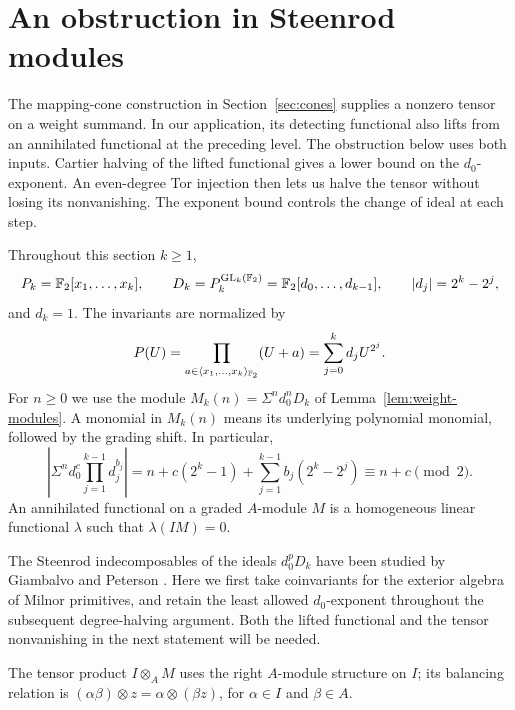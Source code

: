 \section{An obstruction in Steenrod modules}\label{sec:algebra}

The mapping-cone construction in Section~\ref{sec:cones} supplies
a nonzero tensor on a weight summand. In our application, its detecting
functional also lifts from an annihilated functional at the preceding level.
The obstruction below uses both inputs. Cartier halving of the lifted
functional gives a lower bound on the $d_0$-exponent. An
even-degree Tor injection then lets us halve the tensor without losing
its nonvanishing. The exponent bound controls the change of ideal at
each step.

Throughout this section $k\geq1$,
\[
 P_k=\mathbb F_2[x_1,\ldots,x_k],\qquad
 D_k=P_k^{\operatorname{GL}_k(\mathbb F_2)}=\mathbb F_2[d_0,\ldots,d_{k-1}],\qquad
 |d_j|=2^k-2^j,
\]
and $d_k=1$.  The invariants are normalized by
\begin{equation}\label{eq:algebra-dickson-polynomial}
 P(U)=\prod_{a\in\langle x_1,\ldots,x_k\rangle_{\mathbb F_2}}(U+a)
     =\sum_{j=0}^k d_jU^{2^j}.
\end{equation}
For $n\geq0$ we use the module
$M_k(n)=\Sigma^n d_0^nD_k$ of
Lemma~\ref{lem:weight-modules}.  A monomial in $M_k(n)$ means its
underlying polynomial monomial, followed by the grading shift.
In particular,
\begin{equation}\label{eq:algebra-degree-parity}
 \left|\Sigma^n d_0^c\prod_{j=1}^{k-1}d_j^{b_j}\right|
 =n+c(2^k-1)+\sum_{j=1}^{k-1}b_j(2^k-2^j)
 \equiv n+c\pmod2.
\end{equation}
An annihilated functional on a graded $A$-module $M$ is a homogeneous
linear functional $\lambda$ such that $\lambda(IM)=0$.

The Steenrod indecomposables of the ideals \(d_0^pD_k\) have been
studied by Giambalvo and Peterson \cite{GiambalvoPeterson2001}.
Here we first take coinvariants for the exterior algebra of Milnor
primitives, and retain the least allowed \(d_0\)-exponent throughout
the subsequent degree-halving argument. Both the lifted functional
and the tensor nonvanishing in the next statement will be needed.

The tensor product \(I\otimes_A M\) uses the right \(A\)-module
structure on \(I\); its balancing relation is
\((\alpha\beta)\otimes z=\alpha\otimes(\beta z)\), for
\(\alpha\in I\) and \(\beta\in A\).

